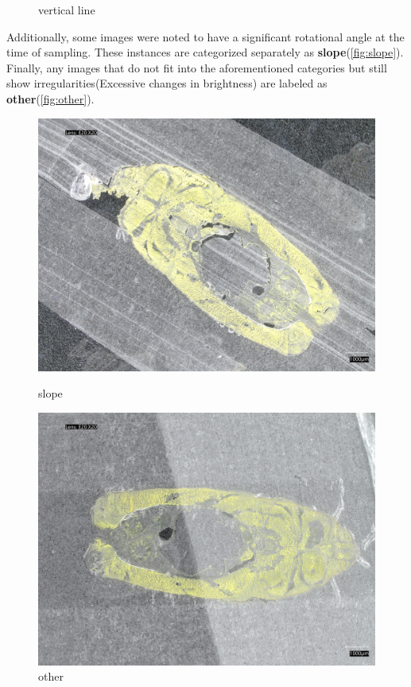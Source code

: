 \begin{figure}[H]
\begin{minipage}{0.45\textwidth}
        \caption{vertical line}
        \label{fig:vertical_line}
    \end{minipage}
\end{figure}

Additionally, some images were noted to have a significant rotational angle at the time of sampling. These instances are categorized separately as \textbf{slope}(\autoref{fig:slope}). Finally, any images that do not fit into the aforementioned categories but still show irregularities(Excessive changes in brightness) are labeled as \textbf{other}(\autoref{fig:other}). 

\begin{figure}[H]
    \centering
    \begin{minipage}{0.45\textwidth}
        \centering
        \includegraphics[width=\textwidth]{./fig/sample_1/slope.jpg}
        \caption{slope}
        \label{fig:slope}
    \end{minipage}
    \begin{minipage}{0.45\textwidth}
        \centering
        \includegraphics[width=\textwidth]{./fig/sample_1/other.jpg}
        \caption{other}
        \label{fig:other}
    \end{minipage}
\end{figure}

